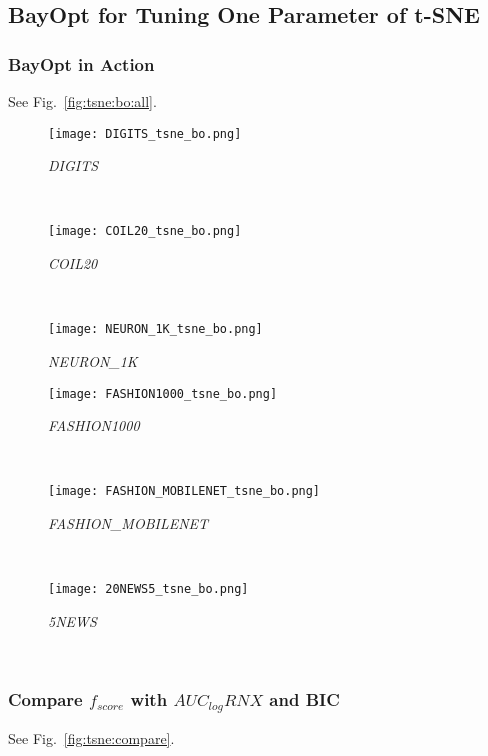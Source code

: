 \subsection{BayOpt for Tuning One Parameter of t-SNE}

\subsubsection*{BayOpt in Action}
See Fig.~\ref{fig:tsne:bo:all}.

\begin{figure*}[pos=h]
    \begin{subfigure}[b]{.32\textwidth}
        \centering
        \texttt{[image: DIGITS\_tsne\_bo.png]}
        \caption{\emph{DIGITS}}
    \end{subfigure}
    ~
    \begin{subfigure}[b]{.32\textwidth}
        \centering
        \texttt{[image: COIL20\_tsne\_bo.png]}
        \caption{\emph{COIL20}}
    \end{subfigure}
    ~
    \begin{subfigure}[b]{.32\textwidth}
        \centering
        \texttt{[image: NEURON\_1K\_tsne\_bo.png]}
        \caption{\emph{NEURON\_1K}}
    \end{subfigure}
    \vfill
    \begin{subfigure}[b]{.32\textwidth}
        \centering
        \texttt{[image: FASHION1000\_tsne\_bo.png]}
        \caption{\emph{FASHION1000}}
    \end{subfigure}
    ~
    \begin{subfigure}[b]{.32\textwidth}
        \centering
        \texttt{[image: FASHION\_MOBILENET\_tsne\_bo.png]}
        \caption{\emph{FASHION\_MOBILENET}}
    \end{subfigure}
    ~
    \begin{subfigure}[b]{.32\textwidth}
        \centering
        \texttt{[image: 20NEWS5\_tsne\_bo.png]}
        \caption{\emph{5NEWS}}
    \end{subfigure}
    ~
    \caption{BayOpt in action for t-SNE}
    \label{fig:tsne:bo:all}
\end{figure*}


\subsubsection*{Compare $f_{score}$ with $AUC_{log}RNX$ and BIC}
See Fig.~\ref{fig:tsne:compare}.


